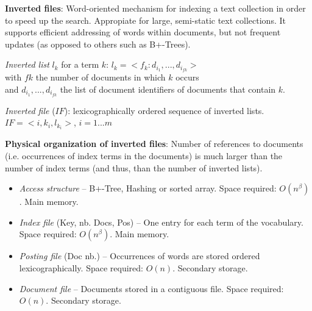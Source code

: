     \textbf{Inverted files}: Word-oriented mechanism for indexing a text collection in order to speed up the search. Appropiate for large, semi-static text collections. It supports efficient addressing of words within documents, but not frequent updates (as opposed to others such as B+-Trees).

    \emph{Inverted list} $l_k$ for a term $k$: $l_k=<f_k:d_{i_1},...,d_{i_{fk}}>$\\
    with $fk$ the number of documents in which $k$ occurs\\
    and $d_{i_1},...,d_{i_{fk}}$ the list of document identifiers of documents that contain $k$.

    \emph{Inverted file} ($IF$): lexicographically ordered sequence of inverted lists.\\
    $IF=<i, k_i, l_{k_i}>$, $i=1...m$

    \textbf{Physical organization of inverted files}: Number of references to documents (i.e. occurrences of index terms in the documents) is much larger than the number of index terms (and thus, than the number of inverted lists).
    \begin{itemize}
      \item \emph{Access structure} -- B+-Tree, Hashing or sorted array. Space required: $O(n^\beta)$. Main memory.
      \item \emph{Index file} (Key, nb. Docs, Pos) -- One entry for each term of the vocabulary. Space required: $O(n^\beta)$. Main memory.
      \item \emph{Posting file} (Doc nb.) -- Occurrences of words are stored ordered lexicographically. Space required: $O(n)$. Secondary storage.
      \item \emph{Document file} -- Documents stored in a contiguous file. Space required: $O(n)$. Secondary storage.
    \end{itemize}

